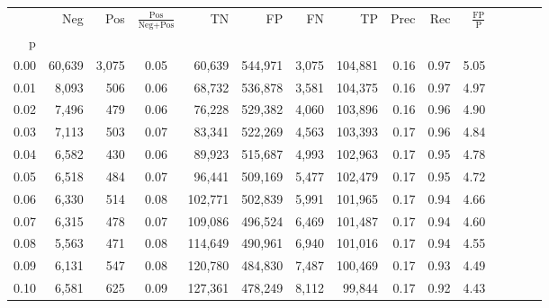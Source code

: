 \begin{tabular}{rrrcrrrrrrrrrrr}
\toprule
{} &     Neg &     Pos & $\frac{\text{Pos}}{\text{Neg}+\text{Pos}}$ &       TN &       FP &       FN &       TP &  Prec &   Rec & $\frac{\text{FP}}{\text{P}}$ \\
p    &         &         &                                            &          &          &          &          &       &       &                              \\
\midrule
0.00 &  60,639 &   3,075 &                                       0.05 &   60,639 &  544,971 &    3,075 &  104,881 &  0.16 &  0.97 &                         5.05 \\
0.01 &   8,093 &     506 &                                       0.06 &   68,732 &  536,878 &    3,581 &  104,375 &  0.16 &  0.97 &                         4.97 \\
0.02 &   7,496 &     479 &                                       0.06 &   76,228 &  529,382 &    4,060 &  103,896 &  0.16 &  0.96 &                         4.90 \\
0.03 &   7,113 &     503 &                                       0.07 &   83,341 &  522,269 &    4,563 &  103,393 &  0.17 &  0.96 &                         4.84 \\
0.04 &   6,582 &     430 &                                       0.06 &   89,923 &  515,687 &    4,993 &  102,963 &  0.17 &  0.95 &                         4.78 \\
0.05 &   6,518 &     484 &                                       0.07 &   96,441 &  509,169 &    5,477 &  102,479 &  0.17 &  0.95 &                         4.72 \\
0.06 &   6,330 &     514 &                                       0.08 &  102,771 &  502,839 &    5,991 &  101,965 &  0.17 &  0.94 &                         4.66 \\
0.07 &   6,315 &     478 &                                       0.07 &  109,086 &  496,524 &    6,469 &  101,487 &  0.17 &  0.94 &                         4.60 \\
0.08 &   5,563 &     471 &                                       0.08 &  114,649 &  490,961 &    6,940 &  101,016 &  0.17 &  0.94 &                         4.55 \\
0.09 &   6,131 &     547 &                                       0.08 &  120,780 &  484,830 &    7,487 &  100,469 &  0.17 &  0.93 &                         4.49 \\
0.10 &   6,581 &     625 &                                       0.09 &  127,361 &  478,249 &    8,112 &   99,844 &  0.17 &  0.92 &                         4.43 \\

\end{tabular}
